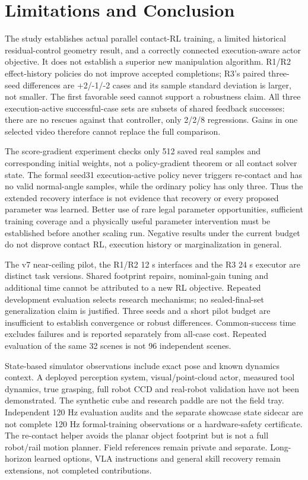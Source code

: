 \section{Limitations and Conclusion}
The study establishes actual parallel contact-RL training, a limited historical residual-control geometry result, and a correctly connected execution-aware actor objective. It does not establish a superior new manipulation algorithm. R1/R2 effect-history policies do not improve accepted completions; R3's paired three-seed differences are +2/-1/-2 cases and its sample standard deviation is larger, not smaller. The first favorable seed cannot support a robustness claim. All three execution-active successful-case sets are subsets of shared feedback successes: there are no rescues against that controller, only 2/2/8 regressions. Gains in one selected video therefore cannot replace the full comparison.

The score-gradient experiment checks only 512 saved real samples and corresponding initial weights, not a policy-gradient theorem or all contact solver state. The formal seed31 execution-active policy never triggers re-contact and has no valid normal-angle samples, while the ordinary policy has only three. Thus the extended recovery interface is not evidence that recovery or every proposed parameter was learned. Better use of rare legal parameter opportunities, sufficient training coverage and a physically useful parameter intervention must be established before another scaling run. Negative results under the current budget do not disprove contact RL, execution history or marginalization in general.

The v7 near-ceiling pilot, the R1/R2 12 s interfaces and the R3 24 s executor are distinct task versions. Shared footprint repairs, nominal-gain tuning and additional time cannot be attributed to a new RL objective. Repeated development evaluation selects research mechanisms; no sealed-final-set generalization claim is justified. Three seeds and a short pilot budget are insufficient to establish convergence or robust differences. Common-success time excludes failures and is reported separately from all-case cost. Repeated evaluation of the same 32 scenes is not 96 independent scenes.

State-based simulator observations include exact pose and known dynamics context. A deployed perception system, visual/point-cloud actor, measured tool dynamics, true grasping, full robot CCD and real-robot validation have not been demonstrated. The synthetic cube and research paddle are not the field tray. Independent 120 Hz evaluation audits and the separate showcase state sidecar are not complete 120 Hz formal-training observations or a hardware-safety certificate. The re-contact helper avoids the planar object footprint but is not a full robot/rail motion planner. Field references remain private and separate. Long-horizon learned options, VLA instructions and general skill recovery remain extensions, not completed contributions.

